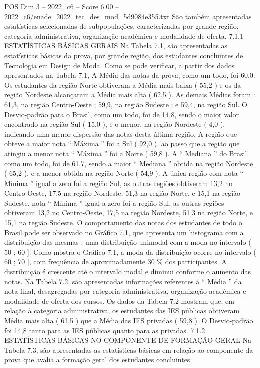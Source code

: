 \begin{textsample}{POS Dim 3 – 2022\_c6 – Score 6.00 – 2022\_c6/enade\_2022\_tec\_des\_mod\_5d9084e355.txt}
São também apresentadas estatísticas selecionadas de subpopulações, caracterizadas por grande região, categoria administrativa, organização acadêmica e modalidade de oferta. 7.1.1 ESTATÍSTICAS BÁSICAS GERAIS Na Tabela 7.1, são apresentadas as estatísticas básicas da prova, por grande região, dos estudantes concluintes de Tecnologia em Design de Moda.
Como se pode verificar, a partir dos dados apresentados na Tabela 7.1, A Média das notas da prova, como um todo, foi 60,0.
Os estudantes da região Norte obtiveram a Média mais baixa ( 55,2 ) e os da região Nordeste alcançaram a Média mais alta ( 62,5 ).
As demais Médias foram : 61,3, na região Centro-Oeste ; 59,9, na região Sudeste ; e 59,4, na região Sul.
O Desvio-padrão para o Brasil, como um todo, foi de 14,8, sendo o maior valor encontrado na região Sul ( 15,0 ), e o menor, na região Nordeste ( 4,0 ), indicando uma menor dispersão das notas desta última região.
A região que obteve a maior nota “ Máxima ” foi a Sul ( 92,0 ), ao passo que a região que atingiu a menor nota “ Máxima ” foi a Norte ( 59,8 ).
A “ Mediana ” do Brasil, como um todo, foi de 61,7, sendo a maior “ Mediana ” obtida na região Nordeste ( 65,2 ), e a menor obtida na região Norte ( 54,9 ).
A única região com nota “ Mínima ” igual a zero foi a região Sul, as outras regiões obtiveram 13,2 no Centro-Oeste, 17,5 na região Nordeste, 51,3 na região Norte, e 15,1 na região Sudeste. nota “ Mínima ” igual a zero foi a região Sul, as outras regiões obtiveram 13,2 no Centro-Oeste, 17,5 na região Nordeste, 51,3 na região Norte, e 15,1 na região Sudeste.
O comportamento das notas dos estudantes de todo o Brasil pode ser observado no Gráfico 7.1, que apresenta um histograma com a distribuição das mesmas : uma distribuição unimodal com a moda no intervalo ( 50 ; 60 ].
Como mostra o Gráfico 7.1, a moda da distribuição ocorre no intervalo ( 60 ; 70 ], com frequência de aproximadamente 30 \% dos participantes.
A distribuição é crescente até o intervalo modal e diminui conforme o aumento das notas.
Na Tabela 7.2, são apresentadas informações referentes à “ Média ” da nota final, desagregadas por categoria administrativa, organização acadêmica e modalidade de oferta dos cursos.
Os dados da Tabela 7.2 mostram que, em relação à categoria administrativa, os estudantes das IES públicas obtiveram Média mais alta ( 61,5 ) que a Média das IES privadas ( 59,8 ).
O Desvio-padrão foi 14,8 tanto para as IES públicas quanto para as privadas. 7.1.2 ESTATÍSTICAS BÁSICAS NO COMPONENTE DE FORMAÇÃO GERAL Na Tabela 7.3, são apresentadas as estatísticas básicas em relação ao componente da prova que avalia a formação geral dos estudantes concluintes.

\end{textsample}
